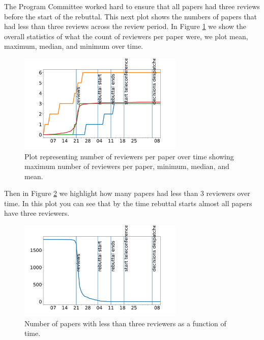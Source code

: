 The Program Committee worked hard to ensure that all  papers had three reviews
before the start of the rebuttal. This next plot shows the numbers of
papers that had less than three reviews across the review period. In Figure \ref{number-of-reviews-over-time} we show the  overall statistics of what the count of reviewers per
paper were, we plot mean, maximum, median, and minimum over time.


\begin{figure}[htb]
\centering
\includegraphics[width=0.70\textwidth]{diagrams/neurips/number-of-reviews-over-time.pdf}

\caption{Plot representing number of reviewers per paper over time showing maximum number of reviewers per paper, minimum, median, and mean. }
\label{number-of-reviews-over-time}
\end{figure}

Then in Figure \ref{paper-short-reviews} we highlight how many papers had less than
3 reviewers over time. In this plot you can see that by the time
rebuttal starts almost all papers have three reviewers.


\begin{figure}[htb]
\centering
\includegraphics[width=0.70\textwidth]{diagrams/neurips/paper-short-reviews.pdf}

\caption{Number of papers with less than three reviewers as a function of time.}
\label{paper-short-reviews}
\end{figure}

